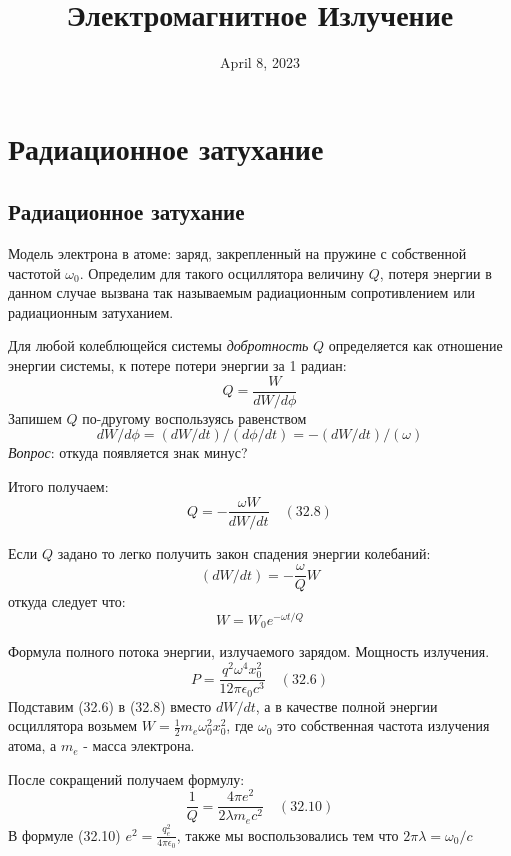 \documentclass[12pt]{article}
\date{April 8, 2023}
\title{Электромагнитное Излучение}
\begin{document}
\maketitle

\tableofcontents

\newpage

\section{Радиационное затухание}

\subsection{Радиационное затухание}

Модель электрона в атоме: заряд, закрепленный на пружине с собственной частотой \(\omega_0\).
Определим для такого осциллятора величину \(Q\), потеря энергии в данном случае вызвана так называемым радиационным сопротивлением или радиационным затуханием.

Для любой колеблющейся системы \textit{добротность} \(Q\) определяется как отношение энергии системы, к потере потери энергии за 1 радиан:
\[
    Q = \frac{W}{dW/d\phi}
\]
Запишем \(Q\) по-другому воспользуясь равенством
\[
    dW/d\phi = (dW/dt)/(d\phi/dt) = -(dW/dt)/(\omega)
\] 
\textit{Вопрос}: откуда появляется знак минус?

\medskip

Итого получаем:
\[
    Q = - \frac{\omega W}{dW/dt} \quad (32.8)
\]

Если \(Q\) задано то легко получить закон спадения энергии колебаний:
\[
    (dW/dt) = - \frac{\omega}{Q} W
\]
откуда следует что:
\[
    W = W_0 e^{-\omega t/Q}
\]

\medskip

Формула полного потока энергии, излучаемого зарядом. Мощность излучения.
\[
    P = \frac{q^2 \omega^4 x_0^2 }{12 \pi \epsilon_0 c^3} \quad (32.6)
\] 
Подставим (32.6) в (32.8) вместо \(dW/dt\), а в качестве полной энергии осциллятора возьмем \(W=\frac{1}{2}m_e\omega_0^2x_0^2\), где \(\omega_0\) это собственная частота излучения атома, а \(m_e\) - масса электрона.

После сокращений получаем формулу:
\[
    \frac{1}{Q} =
    \frac
    {4 \pi e^2}
    {2 \lambda m_e c^2}
    \quad (32.10)
\]
В формуле (32.10) \(e^2=\frac{q_e^2}{4\pi\epsilon_0}\), также мы воспользовались тем что \(2\pi\lambda=\omega_0/c\)
\end{document}
